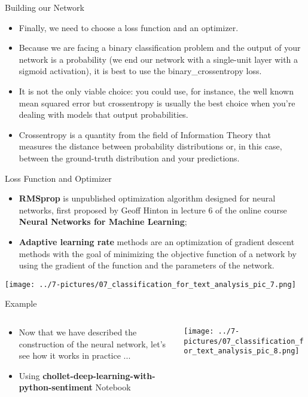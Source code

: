 \documentclass[11pt]{beamer}
\begin{document}
\begin{frame}{Building our Network}
	\begin{itemize}
		\item Finally, we need to choose a loss function and an optimizer. 
		\item Because we are facing a binary classification problem and the output of your network is a probability (we end our network with a single-unit layer with a sigmoid activation), it is best to use the binary\_crossentropy loss. 
		\item It is not the only viable choice: you could use, for instance, the well known mean squared error but crossentropy is usually the best choice when you're dealing with models that output probabilities. 
		\item Crossentropy is a quantity from the field of Information Theory that measures the distance between probability distributions or, in this case, between the ground-truth distribution and your predictions.
	\end{itemize}
\end{frame}
\begin{frame}{Loss Function and Optimizer}
	\begin{itemize}
		\item \textbf{RMSprop} is unpublished optimization algorithm designed for neural networks, first proposed by Geoff Hinton in lecture 6 of the online course \textbf{Neural Networks for Machine Learning};
		\item \textbf{Adaptive learning rate} methods are an optimization of gradient descent methods with the goal of minimizing the objective function of a network by using the gradient of the function and the parameters of the network.
	\end{itemize}
	\begin{center}
	\texttt{[image: ../7-pictures/07\_classification\_for\_text\_analysis\_pic\_7.png]}
	\end{center}
\end{frame}
\begin{frame}{Example}
\begin{columns}[T] %
\begin{column}{.48\textwidth}
        \begin{itemize}
		\item Now that we have described the construction of the neural network, let's see how it works in practice ...
		\item Using \textbf{chollet-deep-learning-with-python-sentiment} Notebook 
        \end{itemize}
\end{column}%
\hfill%
\begin{column}{.48\textwidth}
        \texttt{[image: ../7-pictures/07\_classification\_for\_text\_analysis\_pic\_8.png]}
\end{column}%
\end{columns}
\end{frame}
\end{document}
